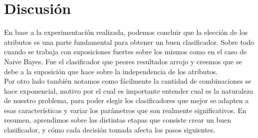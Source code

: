 \section{Discusión}

En base a la experimentación realizada, podemos concluir que la elección de los atributos es una parte fundamental para obtener un buen clasificador. Sobre todo cuando se trabaja con suposiciones fuertes sobre los mismos como en el caso de Naive Bayes. Fue el clasificador que peores resultados arrojo y creemos que se debe a la suposición que hace sobre la independencia de los atributos. \\

Por otro lado también notamos como fácilmente la cantidad de combinaciones se hace exponencial, motivo por el cual es importante entender cual es la naturaleza de nuestro problema, para poder elegir los clasificadores que mejor se adapten a esas características y variar los parámetros que son realmente significativos. En resumen, aprendimos sobre las distintas etapas que consiste crear un buen clasificador, y cómo cada decisión tomada afecta los pasos siguientes.




 

